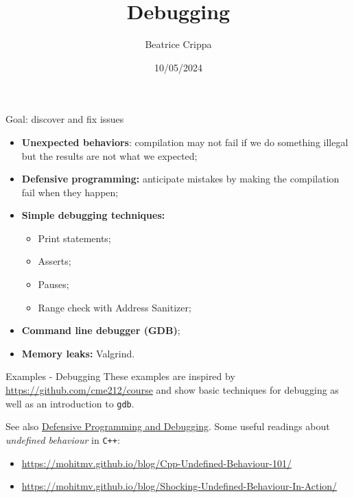 \documentclass[10pt,aspectratio=169]{beamer}
\begin{document}
    \title{Debugging}
    \author{Beatrice Crippa}
    \date{10/05/2024}

\begin{frame}
    \maketitle
\end{frame}

\begin{frame}{Goal: discover and fix issues}
	\begin{itemize}
		\item \textbf{Unexpected behaviors}: compilation may not fail if we do something illegal but the results are not what we expected;
		\item \textbf{Defensive programming:} anticipate mistakes by making the compilation fail when they happen;
		\item \textbf{Simple debugging techniques:}
			\begin{itemize}
				\item Print statements;
				\item Asserts;
				\item Pauses;
				\item Range check with Address Sanitizer;
			\end{itemize}
		\item \textbf{Command line debugger (GDB)};
		\item \textbf{Memory leaks:} Valgrind.
	\end{itemize}
\end{frame}

\begin{frame}{Examples - Debugging}
These examples are inspired by \url{https://github.com/cme212/course}
and show basic techniques for debugging as well as an introduction to \texttt{gdb}.

See also \href{https://gjbex.github.io/DPD-online-book/}{Defensive Programming and Debugging}.
\vfill
Some useful readings about \textit{undefined behaviour} in \texttt{C++}:
\begin{itemize}
\item \url{https://mohitmv.github.io/blog/Cpp-Undefined-Behaviour-101/}
\item \url{https://mohitmv.github.io/blog/Shocking-Undefined-Behaviour-In-Action/}
\end{itemize}
\end{frame}
\end{document}
